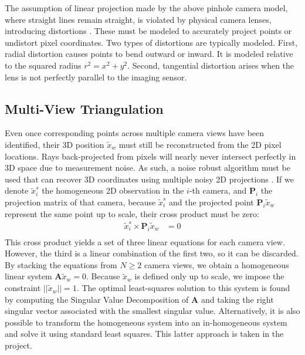 The assumption of linear projection made by the above pinhole camera model, where straight lines remain straight, is violated by physical camera lenses, introducing distortions \parencite{Lanz2026Notes}. These must be modeled to accurately project points or undistort pixel coordinates. Two types of distortions are typically modeled. First, radial distortion causes points to bend outward or inward. It is modeled relative to the squared radius $r^2 = x^2 + y^2$. Second, tangential distortion arises when the lens is not perfectly parallel to the imaging sensor.


\subsection{Multi-View Triangulation} \label{triangulate}

Even once corresponding points across multiple camera views have been identified, their 3D position $\tilde{x}_w$ must still be reconstructed from the 2D pixel locations. Rays back-projected from pixels will nearly never intersect perfectly in 3D space due to measurement noise. As such, a noise robust algorithm must be used that can recover 3D coordinates using multiple noisy 2D projections \parencite{Lanz2026Notes,hartley2003multiple}. If we denote $\tilde{x}_i^s$ the homogeneous 2D observation in the $i$-th camera, and $\mathbf{P}_i$ the projection matrix of that camera, because $\tilde{x}_i^s$ and the projected point $\mathbf{P}_i \tilde{x}_w$ represent the same point up to scale, their cross product must be zero:
\begin{align*}
  \tilde{x}_i^s \times \mathbf{P}_i \tilde{x}_w &= 0 \\
\end{align*}
This cross product yields a set of three linear equations for each camera view. However, the third is a linear combination of the first two, so it can be discarded. By stacking the equations from $N \ge 2$ camera views, we obtain a homogeneous linear system $\mathbf{A} \tilde{x}_w = 0$. Because $\tilde{x}_w$ is defined only up to scale, we impose the constraint $||\tilde{x}_w|| = 1$. The optimal least-squares solution to this system is found by computing the Singular Value Decomposition of $\mathbf{A}$ and taking the right singular vector associated with the smallest singular value. Alternatively, it is also possible to transform the homogeneous system into an in-homogeneous system and solve it using standard least squares. This latter approach is taken in the project.
